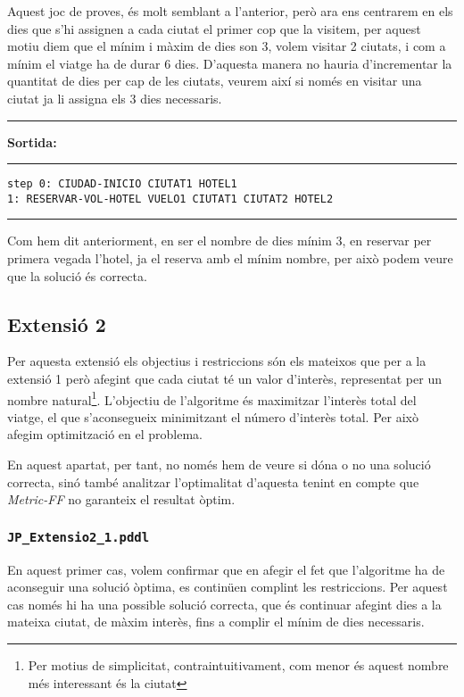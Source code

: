\documentclass[11pt,a4paper]{article}
\begin{document}
Aquest joc de proves, és molt semblant a l'anterior, però ara ens centrarem en els dies que s'hi assignen a cada ciutat el primer cop que la visitem, per aquest motiu diem que el mínim i màxim de dies son 3, volem visitar 2 ciutats, i com a mínim el viatge ha de durar 6 dies. D'aquesta manera no hauria d'incrementar la quantitat de dies per cap de les ciutats, veurem així si només en visitar una ciutat ja li assigna els 3 dies necessaris.

\begin{samepage}
\medskip
\noindent
\rule{0.1\textwidth}{0.5mm}
\textbf{Sortida:}
\rule{0.76\textwidth}{0.5mm}
\begin{verbatim}
step 0: CIUDAD-INICIO CIUTAT1 HOTEL1
1: RESERVAR-VOL-HOTEL VUELO1 CIUTAT1 CIUTAT2 HOTEL2
\end{verbatim}
\rule{\textwidth}{0.5mm}
\medskip
\end{samepage}

Com hem dit anteriorment, en ser el nombre de dies mínim 3, en reservar per primera vegada l'hotel, ja el reserva amb el mínim nombre, per això podem veure que la solució és correcta.

\subsection{Extensió 2}

Per aquesta extensió els objectius i restriccions són els mateixos que per a  la extensió 1 però afegint que cada ciutat té un valor d'interès, representat per un nombre natural\footnote{Per motius de simplicitat, contraintuitivament, com menor és aquest nombre més interessant és la ciutat}. L'objectiu de l'algoritme és maximitzar l'interès total del viatge, el que s'aconsegueix minimitzant el número d'interès total. Per això afegim optimització en el problema. 

En aquest apartat, per tant, no només hem de veure si dóna o no una solució correcta, sinó també analitzar l'optimalitat d'aquesta tenint en compte que \emph{Metric-FF} no garanteix el resultat òptim. 

\subsubsection*{\texttt{JP\_Extensio2\_1.pddl}}

En aquest primer cas, volem confirmar que en afegir el fet que l'algoritme ha de aconseguir una solució òptima, es continüen complint les restriccions. Per aquest cas només hi ha una possible solució correcta, que és continuar afegint dies a la mateixa ciutat, de màxim interès, fins a complir el mínim de dies necessaris.
\end{document}
